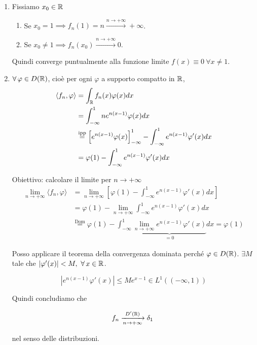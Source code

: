 \begin{enumerate}
\item Fissiamo $x_{0} \in \mathbb{R} $
\begin{enumerate}
\item Se $x_{0} = 1\implies f_{n}(1) = n\xrightarrow{n\rightarrow + \infty } + \infty $.
\item Se $x_{0} \neq 1\implies f_{n}(x_{0})\xrightarrow{n\rightarrow + \infty } 0$.
\end{enumerate}

Quindi converge puntualmente alla funzione limite $f(x) \equiv 0\ \forall x\neq 1$.
\item $\forall \varphi \in D(\RR)$, cioè per ogni $\varphi $ a supporto compatto in $\mathbb{R} $,
\begin{align*}
\langle f_{n} ,\varphi \rangle  & = \int _{\mathbb{R} } f_{n}(x) \varphi (x) dx\\
 & = \int ^{1}_{ - \infty } ne^{n(x - 1)} \varphi (x) dx\\
 & \overset{\text{ipp}}{ = }\left[ e^{n(x - 1)} \varphi (x)\right]^{1}_{ - \infty } - \int ^{1}_{ - \infty } e^{n(x - 1)} \varphi '(x) dx\\
 & = \varphi (1) - \int ^{1}_{ - \infty } e^{n(x - 1)} \varphi '(x) dx
\end{align*}

Obiettivo: calcolare il limite per $n\rightarrow + \infty $
\begin{align*}
\lim\limits _{n\rightarrow + \infty } \langle f_{n} ,\varphi \rangle  & = \lim\limits _{n\rightarrow + \infty }\left[ \varphi (1) - \int ^{1}_{ - \infty } e^{n(x - 1)} \varphi '(x) dx\right]\\
 & = \varphi (1) - \lim\limits _{n\rightarrow + \infty }\int ^{1}_{ - \infty } e^{n(x - 1)} \varphi '(x) dx\\
 & \overset{\text{Dom}}{ = } \varphi (1) - \int ^{1}_{ - \infty }\underbrace{\lim\limits _{n\rightarrow + \infty } e^{n(x - 1)} \varphi '(x)}_{ = 0} dx = \varphi (1)
\end{align*}

Posso applicare il teorema della convergenza dominata perché $\varphi \in D(\mathbb{R})$. $\exists M$ tale che $| \varphi '(x)| < M,\ \forall x\in \RR $.

\begin{equation*}
\left| e^{n(x - 1)} \varphi '(x)\right| \leq Me^{x - 1} \in L^{1}((- \infty ,1))
\end{equation*}

Quindi concludiamo che

\begin{equation*}
f_{n}\xrightarrow[n\rightarrow + \infty ]{D'(\mathbb{R})} \delta _{1} \ 
\end{equation*}

nel senso delle distribuzioni.
\end{enumerate}
